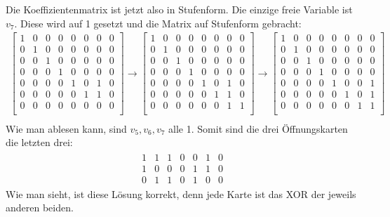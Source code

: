 \documentclass[a4paper,10pt,ngerman]{scrartcl}
\begin{document}
Die Koeffizientenmatrix ist jetzt also in Stufenform. Die einzige freie Variable ist $v_7$. Diese wird auf 1 gesetzt und die Matrix auf Stufenform gebracht:
\begin{align*}
\left[\begin{array}{ccccccc|c}
1&0&0&0&0&0&0&0\\
0&1&0&0&0&0&0&0\\
0&0&1&0&0&0&0&0\\
0&0&0&1&0&0&0&0\\
0&0&0&0&1&0&1&0\\
0&0&0&0&0&1&1&0\\
0&0&0&0&0&0&0&0\\
\end{array}\right]
\rightarrow \left[\begin{array}{ccccccc|c}
1&0&0&0&0&0&0&0\\
0&1&0&0&0&0&0&0\\
0&0&1&0&0&0&0&0\\
0&0&0&1&0&0&0&0\\
0&0&0&0&1&0&1&0\\
0&0&0&0&0&1&1&0\\
0&0&0&0&0&0&1&1\\
\end{array}\right]
\rightarrow \left[\begin{array}{ccccccc|c}
1&0&0&0&0&0&0&0\\
0&1&0&0&0&0&0&0\\
0&0&1&0&0&0&0&0\\
0&0&0&1&0&0&0&0\\
0&0&0&0&1&0&0&1\\
0&0&0&0&0&1&0&1\\
0&0&0&0&0&0&1&1\\
\end{array}\right]\\
\end{align*}
Wie man ablesen kann, sind $v_5, v_6, v_7$ alle 1. Somit sind die drei Öffnungskarten die letzten drei:
\begin{align*}
\begin{array}{ccccccc}
1 & 1 & 1 & 0 & 0 & 1 & 0 \\ 
1 & 0 & 0 & 0 & 1 & 1 & 0 \\ 
0 & 1 & 1 & 0 & 1 & 0 & 0
\end{array}
\end{align*}
Wie man sieht, ist diese Lösung korrekt, denn jede Karte ist das XOR der jeweils anderen beiden.\\\\
\end{document}
